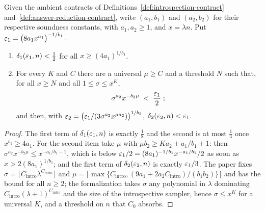 \begin{lemma}
\label{lem:compress-margin}
\leanok
Given the ambient contracts of Definitions~\ref{def:introspection-contract}
and~\ref{def:answer-reduction-contract}, write $(a_1,b_1)$ and $(a_2,b_2)$ for
their respective soundness constants, with $a_1,a_2\geq1$, and
$x = \lambda n$. Put $\varepsilon_1 = \bigl( 8 a_1 x^{a_1} \bigr)^{-1/b_1}$.
\begin{enumerate}
\item $\delta_1(\varepsilon_1, n) < \frac12$ for all $x \geq (4 a_1)^{1/b_1}$.
\item For every $K$ and $C$ there are a universal $\mu \geq C$ and a threshold $N$ such
  that, for all $x \geq N$ and all $1 \leq \sigma \leq x^K$,
  \begin{equation*}
    \sigma^{a_2} x^{-b_2 \mu} \;<\; \frac{\varepsilon_1}{2}\;;
  \end{equation*}
  and then, with $\varepsilon_2 = \bigl( \varepsilon_1 / (3 \sigma^{a_2} x^{\mu a_2}) \bigr)^{1/b_2}$,
  $\delta_2(\varepsilon_2, n) < \varepsilon_1$.
\end{enumerate}
\end{lemma}
\begin{proof}
\leanok
The first term of $\delta_1(\varepsilon_1, n)$ is exactly $\frac18$ and the second is at most
$\frac14$ once $x^{b_1} \geq 4 a_1$. For the second item take $\mu$ with $\mu b_2 \geq K a_2
+ a_1 / b_1 + 1$: then $\sigma^{a_2} x^{-b_2 \mu} \leq x^{-a_1/b_1 - 1}$, which is below
$\varepsilon_1 / 2 = (8 a_1)^{-1/b_1} x^{-a_1/b_1} / 2$ as soon as $x > 2 (8 a_1)^{1/b_1}$; and the
first term of $\delta_2(\varepsilon_2, n)$ is exactly $\varepsilon_1 / 3$. The paper fixes $\sigma =
\lceil C_{\mathrm{intro}} \lambda^{C_{\mathrm{intro}}} \rceil$ and $\mu = \lceil \max\{
C_{\mathrm{intro}}, (9 a_1 + 2 a_2 C_{\mathrm{intro}}) / (b_1 b_2) \} \rceil$ and has the bound
for all $n \geq 2$; the formalization takes $\sigma$ any polynomial in $\lambda$ dominating
$C_{\mathrm{intro}} (\lambda + 1)^{C_{\mathrm{intro}}}$ and the size of the introspective
sampler, hence $\sigma \leq x^K$ for a
universal $K$, and a threshold on $n$ that $C_0$ absorbs.
\end{proof}

\effortEasy

